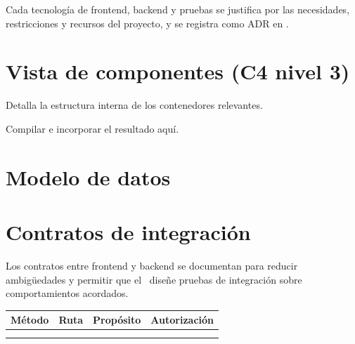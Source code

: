 \documentclass[11pt,a4paper]{article}
\begin{document}
\begin{nota}
Cada tecnología de frontend, backend y pruebas se justifica por las necesidades,
restricciones y recursos del proyecto, y se registra como ADR en
.
\end{nota}

\section{Vista de componentes (C4 nivel 3)}

Detalla la estructura interna de los contenedores relevantes.

\begin{porcompletar}
Compilar  e incorporar el resultado aquí.
\end{porcompletar}

\section{Modelo de datos}

\begin{porcompletar}
\end{porcompletar}

\section{Contratos de integración}

Los contratos entre frontend y backend se documentan para reducir ambigüedades y
permitir que el \lgQARol\ diseñe pruebas de integración sobre comportamientos
acordados.

\begin{center}
\begin{tabularx}{\linewidth}{@{}L{1.9cm} L{3.0cm} Y C{2.7cm}@{}}
\toprule
\sffamily\bfseries\color{lgPrimario}Método &
\sffamily\bfseries\color{lgPrimario}Ruta &
\sffamily\bfseries\color{lgPrimario}Propósito &
\sffamily\bfseries\color{lgPrimario}Autorización \\
\midrule
{}  &       &  &  \\
 &       &  &  \\
\bottomrule
\end{tabularx}
\end{center}
\end{document}
